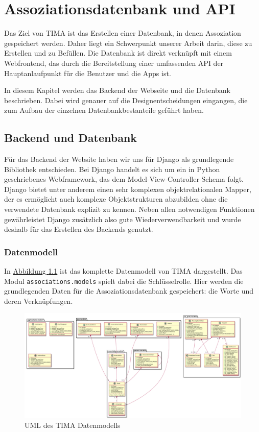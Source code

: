 \chapter{Assoziationsdatenbank und API}
Das Ziel von TIMA ist das Erstellen einer Datenbank, in denen Assoziation gespeichert werden. Daher liegt ein Schwerpunkt unserer Arbeit darin, diese zu Erstellen und zu Befüllen. Die Datenbank ist direkt verknüpft mit einem Webfrontend, das durch die Bereitstellung einer umfassenden API der Hauptanlaufpunkt für die Benutzer und die Apps ist.

In diesem Kapitel werden das Backend der Webseite und die Datenbank beschrieben. Dabei wird genauer auf die Designentscheidungen eingangen, die zum Aufbau der einzelnen Datenbankbestanteile geführt haben.

\section{Backend und Datenbank}
Für das Backend der Website haben wir uns für Django als grundlegende Bibliothek entschieden. Bei Django handelt es sich um ein in Python geschriebenes Webframework, das dem Model-View-Controller-Schema folgt. Django bietet unter anderem einen sehr komplexen objektrelationalen Mapper, der es ermöglicht auch komplexe Objektstrukturen abzubilden ohne die verwendete Datenbank explizit zu kennen. Neben allen notwendigen Funktionen gewährleistet Django zusätzlich also gute Wiederverwendbarkeit und wurde deshalb für das Erstellen des Backends genutzt.

\subsection{Datenmodell}
In \hyperref[fig:uml]{Abbildung \ref*{fig:uml}} ist das komplette Datenmodell von TIMA dargestellt. Das Modul \texttt{associations.models} spielt dabei die Schlüsselrolle. Hier werden die grundlegenden Daten für die Assoziationsdatenbank gespeichert: die Worte und deren Verknüpfungen.

\begin{figure}
	\centering
	\includegraphics[width=\textwidth]{images/uml.png}
	\caption{UML des TIMA Datenmodells}
	\label{fig:uml}
\end{figure}

